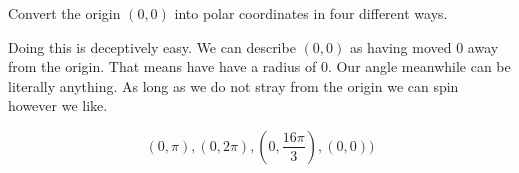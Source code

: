 \begin{problem}[97]
    Convert the origin $(0,0)$ into polar coordinates in four different ways.
\end{problem}

\begin{solution}
    Doing this is deceptively easy. We can describe $(0,0)$ as having moved 0 away from the origin. That means have have a radius of 0. Our angle meanwhile can be literally anything. As long as we do not stray from the origin we can spin however we like. 
    
    \[\boxed{(0, \pi), (0,2\pi), \left( 0,\frac{16\pi}{3} \right), (0, 0))}\]
\end{solution}